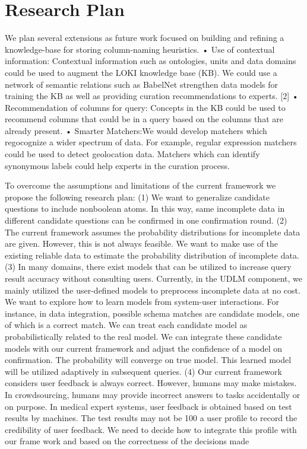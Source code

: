 \documentclass{vldb}
\begin{document}
\section{Research Plan}
We plan several extensions as future work focused on building and
refining a knowledge-base for storing column-naming heuristics.
• Use of contextual information: Contextual information
such as ontologies, units and data domains could be used to augment
the LOKI knowledge base (KB). We could use a network of
semantic relations such as BabelNet strengthen data models for
training the KB as well as providing curation recommendations
to experts. [2] • Recommendation of columns for query: Concepts
in the KB could be used to recommend columns that could be
in a query based on the columns that are already present. • Smarter
Matchers:We would develop matchers which regocognize a wider
spectrum of data. For example, regular expression matchers could
be used to detect geolocation data. Matchers which can identify
synonymous labels could help experts in the curation process.

To overcome the assumptions and limitations of the current
framework we propose the following research plan: (1)
We want to generalize candidate questions to include nonboolean
atoms. In this way, same incomplete data in different
candidate questions can be confirmed in one confirmation
round. (2) The current framework assumes the probability
distributions for incomplete data are given. However,
this is not always feasible. We want to make use of the existing
reliable data to estimate the probability distribution of
incomplete data. (3) In many domains, there exist models
that can be utilized to increase query result accuracy without
consulting users. Currently, in the UDLM component,
we mainly utilized the user-defined models to preprocess incomplete
data at no cost. We want to explore how to learn
models from system-user interactions. For instance, in data
integration, possible schema matches are candidate models,
one of which is a correct match. We can treat each candidate
model as probabilistically related to the real model. We can
integrate these candidate models with our current framework
and adjust the confidence of a model on confirmation.
The probability will converge on true model. This learned
model will be utilized adaptively in subsequent queries. (4)
Our current framework considers user feedback is always
correct. However, humans may make mistakes. In crowdsourcing,
humans may provide incorrect answers to tasks
accidentally or on purpose. In medical expert systems, user
feedback is obtained based on test results by machines. The
test results may not be 100%
a user profile to record the credibility of user feedback. We
need to decide how to integrate this profile with our frame work and based on the correctness of the decisions made
\end{document}
